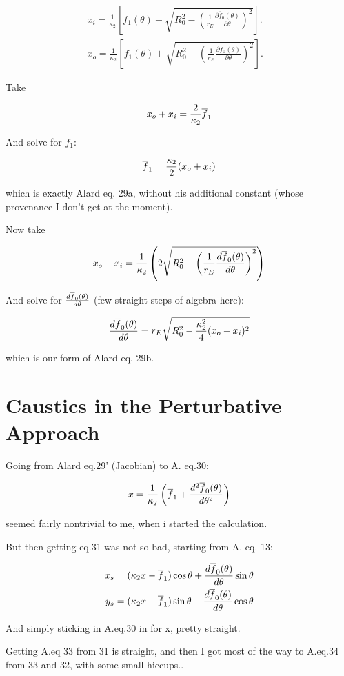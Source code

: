 \documentclass{article}
\def\be{\begin{equation}}
\def\ee{\end{equation}}
\def\bea{\begin{eqnarray}}
\def\eea{\end{eqnarray}}
\newcommand{\rp}{\right)}
\newcommand{\lp}{\left(}
\def\dfdt{{d \overline{f}_0(\theta) \over d \theta}}
\def\dsqfdt{{d^2 \overline{f}_0(\theta) \over d \theta^2}}
\def\fbar{\overline{f}_1}
\begin{document}
\bea
x_i = \frac{1}{\kappa_2}\left[ \overline{f}_{1}(\theta) - \sqrt{R_0^2 - \left( \frac{1}{r_E}\frac{\partial \overline{f}_0(\theta)}{\partial \theta} \right)^2} \right]. \;\;\;  \\
x_o = \frac{1}{\kappa_2}\left[ \overline{f}_{1}(\theta) + \sqrt{R_0^2 - \left( \frac{1}{r_E}\frac{\partial \overline{f}_0(\theta)}{\partial \theta} \right)^2} \right]. \;\;\;  
\eea


Take 

\be
x_o + x_i = {2 \over \kappa_2} \fbar 
\ee

And solve for $\fbar$:


\be
\fbar = {\kappa_2 \over 2} (x_o+x_i)
\ee

which is exactly Alard eq. 29a, without his additional constant (whose provenance I don't get at the moment).

Now take 

\be
x_o - x_i = {1 \over \kappa_2} \lp 2 \sqrt{R_0^2 - {\lp {1 \over r_E} \dfdt \rp}^2 }\rp
\ee

And solve for $\dfdt$ (few straight steps of algebra here):

\be
\dfdt = r_E \sqrt{R_0^2 - {\kappa_2^2 \over 4} (x_o-x_i)^2 }
\ee

which is our form of Alard eq. 29b.


\section{Caustics in the Perturbative Approach}

Going from Alard eq.29' (Jacobian) to A. eq.30:

\be
x =  {1 \over \kappa_2 } \lp \fbar + \dsqfdt \rp
\ee

seemed fairly nontrivial to me, when i started the calculation.

But then getting eq.31 was not so bad, starting from A. eq. 13:

\bea
x_s = (\kappa_2 x - \fbar) \cos\theta + \dfdt \sin \theta \\
y_s = (\kappa_2 x - \fbar) \sin\theta - \dfdt \cos \theta 
\eea

And simply sticking in A.eq.30 in for x, pretty straight.

Getting A.eq 33 from 31 is straight, and then I got most of the way to
A.eq.34 from 33 and 32, with some small hiccups..
\end{document}
